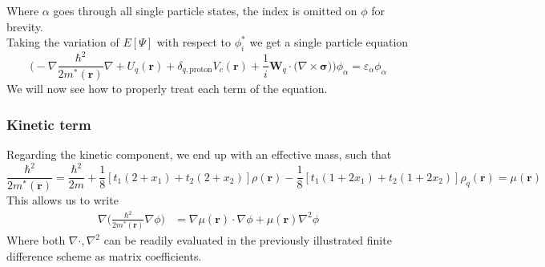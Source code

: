 Where $\alpha$ goes through all single particle states, the index is omitted on $\phi$ for brevity.
\\Taking the variation of $E[\Psi]$ with respect to $\phi_i^*$ we get a single particle equation
\begin{equation}
   \bigg(-\nabla \frac{\hbar^2}{2m^*(\mathbf r)} \nabla + U_q(\mathbf r)+\delta_{q, \text{proton}}V_c(\mathbf r)+ \frac 1 i \mathbf W_q \cdot (\nabla \times \boldsymbol{\sigma)} \bigg)\phi_\alpha = \varepsilon_\alpha\phi_\alpha 
\end{equation}
We will now see how to properly treat each term of the equation.

\subsubsection{Kinetic term}
Regarding the kinetic component, we end up with an effective mass, such that 
\[\frac{\hbar^2}{2m^*(\mathbf r)} = \frac{\hbar^2}{2m} + \frac 1 8 [t_1(2+x_1)+t_2(2+x_2)]\rho(\mathbf r) - \frac 1 8 [t_1(1+2x_1)+t_2(1+2x_2)]\rho_q(\mathbf r ) = \mu(\mathbf r)\]
This allows us to write
\begin{align}
    \nabla\bigg( \frac{\hbar^2}{2m^*(\mathbf r)} \nabla \phi\bigg)&= \nabla \mu(\mathbf r)\cdot \nabla \phi +\mu(\mathbf r)\nabla^2 \phi 
\end{align}
Where both $\nabla\cdot, \nabla^2$ can be readily evaluated in the previously illustrated finite difference scheme as matrix coefficients.



